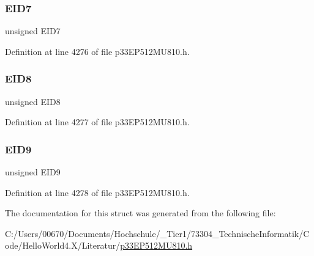 \subsubsection{\texorpdfstring{E\+I\+D7}{EID7}}
{\footnotesize\ttfamily unsigned E\+I\+D7}



Definition at line 4276 of file p33\+E\+P512\+M\+U810.\+h.

\mbox{\label{structtag_c1_r_x_f9_e_i_d_b_i_t_s_acca25e0b7d86eb499d01f85222baea87}} 
\subsubsection{\texorpdfstring{E\+I\+D8}{EID8}}
{\footnotesize\ttfamily unsigned E\+I\+D8}



Definition at line 4277 of file p33\+E\+P512\+M\+U810.\+h.

\mbox{\label{structtag_c1_r_x_f9_e_i_d_b_i_t_s_ac6748f73d4ada8538b06548be4f396c2}} 
\subsubsection{\texorpdfstring{E\+I\+D9}{EID9}}
{\footnotesize\ttfamily unsigned E\+I\+D9}



Definition at line 4278 of file p33\+E\+P512\+M\+U810.\+h.



The documentation for this struct was generated from the following file\+:\begin{DoxyCompactItemize}
\item 
C\+:/\+Users/00670/\+Documents/\+Hochschule/\+\_\+\+Tier1/73304\+\_\+\+Technische\+Informatik/\+Code/\+Hello\+World4.\+X/\+Literatur/\hyperlink{p33_e_p512_m_u810_8h}{p33\+E\+P512\+M\+U810.\+h}\end{DoxyCompactItemize}
